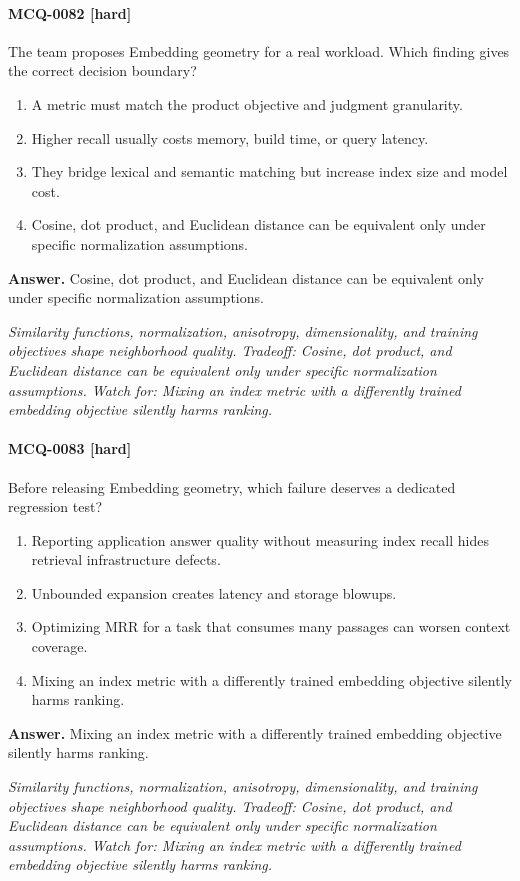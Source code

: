 \paragraph{MCQ-0082 [hard]} The team proposes Embedding geometry for a real workload. Which finding gives the correct decision boundary?
\begin{enumerate}[label=\Alph*.]
\item A metric must match the product objective and judgment granularity.
\item Higher recall usually costs memory, build time, or query latency.
\item They bridge lexical and semantic matching but increase index size and model cost.
\item Cosine, dot product, and Euclidean distance can be equivalent only under specific normalization assumptions.
\end{enumerate}
\noindent\textbf{Answer.} Cosine, dot product, and Euclidean distance can be equivalent only under specific normalization assumptions.
\par\textit{Similarity functions, normalization, anisotropy, dimensionality, and training objectives shape neighborhood quality. Tradeoff: Cosine, dot product, and Euclidean distance can be equivalent only under specific normalization assumptions. Watch for: Mixing an index metric with a differently trained embedding objective silently harms ranking.}
\paragraph{MCQ-0083 [hard]} Before releasing Embedding geometry, which failure deserves a dedicated regression test?
\begin{enumerate}[label=\Alph*.]
\item Reporting application answer quality without measuring index recall hides retrieval infrastructure defects.
\item Unbounded expansion creates latency and storage blowups.
\item Optimizing MRR for a task that consumes many passages can worsen context coverage.
\item Mixing an index metric with a differently trained embedding objective silently harms ranking.
\end{enumerate}
\noindent\textbf{Answer.} Mixing an index metric with a differently trained embedding objective silently harms ranking.
\par\textit{Similarity functions, normalization, anisotropy, dimensionality, and training objectives shape neighborhood quality. Tradeoff: Cosine, dot product, and Euclidean distance can be equivalent only under specific normalization assumptions. Watch for: Mixing an index metric with a differently trained embedding objective silently harms ranking.}
